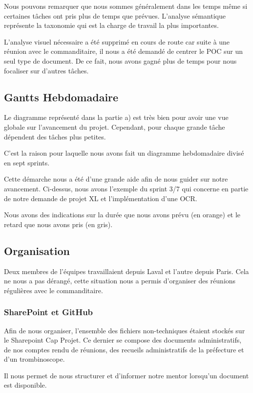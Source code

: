 Nous pouvons remarquer que nous sommes généralement dans les temps même si certaines tâches ont pris plus de temps que prévues.
L'analyse sémantique représente la taxonomie qui est la charge de travail la plus importantes.  

L'analyse visuel nécessaire a été supprimé en cours de route car suite à une réunion avec le commanditaire, il nous a été demandé de centrer le POC sur un seul type de document.
De ce fait, nous avons gagné plus de temps pour nous focaliser sur d'autres tâches.  

\subsection{Gantts Hebdomadaire}
Le diagramme représenté dans la partie a) est très bien pour avoir une vue globale sur l'avancement du projet.
Cependant, pour chaque grande tâche dépendent des tâches plus petites.  

C'est la raison pour laquelle nous avons fait un diagramme hebdomadaire divisé en sept sprints.




Cette démarche nous a été d'une grande aide afin de nous guider sur notre avancement.
Ci-dessus, nous avons l’exemple du sprint 3/7 qui concerne en partie de notre demande de projet XL et l'implémentation d’une OCR\@.

Nous avons des indications sur la durée que nous avons prévu (en orange) et le retard que nous avons pris (en gris).  

\subsection{Organisation}
Deux membres de l'équipes travaillaient depuis Laval et l'autre depuis Paris.
Cela ne nous a pas dérangé, cette situation nous a permis d'organiser des réunions régulières avec le commanditaire.

\subsubsection{SharePoint et GitHub}
Afin de nous organiser, l'ensemble des fichiers non-techniques étaient stockés sur le Sharepoint Cap Projet.
Ce dernier se compose des documents administratifs, de nos comptes rendu de réunions, des recueils administratifs de la préfecture et d'un trombinoscope.

Il nous permet de nous structurer et d'informer notre mentor lorsqu'un document est disponible. 


